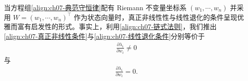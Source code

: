 \documentclass[../../main.tex]{subfiles}
\begin{document}
当方程组\eqref{align:ch07-典范守恒律}配有 Riemann 不变量坐标系 $(w_1,\cdots,w_n)$ 并采用 $W=(w_1,\cdots,w_n)^\top$ 作为状态向量时，真正非线性性与线性退化的条件呈现优雅而富有启发性的形式。事实上，利用\eqref{align:ch07-链式法则}，我们推出\eqref{align:ch07-真正非线性条件}与\eqref{align:ch07-线性退化条件}分别等价于
\begin{align}
\frac{\partial\lambda_i}{\partial w_i}\neq 0
\label{align:ch07-真正非线性W}
\end{align}
与
\begin{align}
\frac{\partial\lambda_i}{\partial w_i}=0.
\label{align:ch07-线性退化W}
\end{align}
\end{document}
